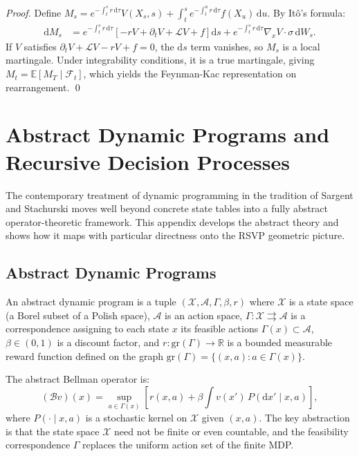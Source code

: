 \documentclass[12pt, a4paper, openany]{book}
\theoremstyle{plain}
\theoremstyle{definition}
\theoremstyle{remark}
\newcommand{\BellmanOp}{\mathcal{B}}
\begin{document}
\begin{proof}
Define $M_s = e^{-\int_t^s r\,\mathrm{d}\tau} V(X_s, s) + \int_t^s e^{-\int_t^u r\,\mathrm{d}\tau} f(X_u)\,\mathrm{d}u$. By Itô's formula:
\begin{align*}
\mathrm{d}M_s &= e^{-\int_t^s r\,\mathrm{d}\tau}\!\left[-r V + \partial_t V + \mathcal{L} V + f\right]\mathrm{d}s + e^{-\int_t^s r\,\mathrm{d}\tau} \nabla_x V \cdot \sigma\,\mathrm{d}W_s.
\end{align*}
If $V$ satisfies $\partial_t V + \mathcal{L} V - rV + f = 0$, the $\mathrm{d}s$ term vanishes, so $M_s$ is a local martingale. Under integrability conditions, it is a true martingale, giving $M_t = \mathbb{E}[M_T \mid \mathcal{F}_t]$, which yields the Feynman-Kac representation on rearrangement. \qed
\end{proof}

\chapter{Abstract Dynamic Programs and Recursive Decision Processes}

The contemporary treatment of dynamic programming in the tradition of Sargent and Stachurski moves well beyond concrete state tables into a fully abstract operator-theoretic framework. This appendix develops the abstract theory and shows how it maps with particular directness onto the RSVP geometric picture.

\section{Abstract Dynamic Programs}

An abstract dynamic program is a tuple $(\mathcal{X}, \mathcal{A}, \Gamma, \beta, r)$ where $\mathcal{X}$ is a state space (a Borel subset of a Polish space), $\mathcal{A}$ is an action space, $\Gamma: \mathcal{X} \rightrightarrows \mathcal{A}$ is a correspondence assigning to each state $x$ its feasible actions $\Gamma(x) \subset \mathcal{A}$, $\beta \in (0,1)$ is a discount factor, and $r: \mathrm{gr}(\Gamma) \to \mathbb{R}$ is a bounded measurable reward function defined on the graph $\mathrm{gr}(\Gamma) = \{(x,a) : a \in \Gamma(x)\}$.

The abstract Bellman operator is:
\[
(\BellmanOp v)(x) = \sup_{a \in \Gamma(x)}\left[r(x,a) + \beta \int v(x') \, P(\mathrm{d}x' \mid x, a)\right],
\]
where $P(\cdot \mid x, a)$ is a stochastic kernel on $\mathcal{X}$ given $(x,a)$. The key abstraction is that the state space $\mathcal{X}$ need not be finite or even countable, and the feasibility correspondence $\Gamma$ replaces the uniform action set of the finite MDP.
\end{document}
